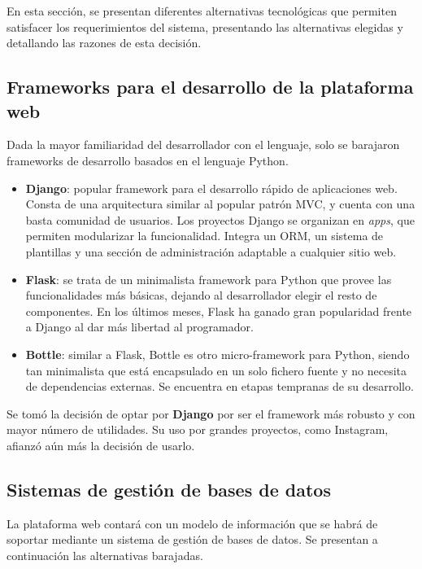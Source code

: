 En esta sección, se presentan diferentes alternativas tecnológicas que permiten
satisfacer los requerimientos del sistema, presentando las alternativas elegidas
y detallando las razones de esta decisión.


\subsection{Frameworks para el desarrollo de la plataforma web}

Dada la mayor familiaridad del desarrollador con el lenguaje, solo se barajaron
frameworks de desarrollo basados en el lenguaje Python.

\begin{itemize}
\item \textbf{Django}\cite{django}: popular framework para el desarrollo rápido
  de aplicaciones web. Consta de una arquitectura similar al popular patrón
  \ac{MVC}, y cuenta con una basta comunidad de usuarios. Los proyectos Django
  se organizan en \textit{apps}, que permiten modularizar la
  funcionalidad. Integra un \ac{ORM}, un sistema de plantillas y una sección de
  administración adaptable a cualquier sitio web.

\item \textbf{Flask}\cite{flask}: se trata de un minimalista framework para Python que
  provee las funcionalidades más básicas, dejando al desarrollador elegir el
  resto de componentes. En los últimos meses, Flask ha ganado gran popularidad
  frente a Django al dar más libertad al programador.

\item \textbf{Bottle}\cite{bottle}: similar a Flask, Bottle es otro
  micro-framework para Python, siendo tan minimalista que está encapsulado en un
  solo fichero fuente y no necesita de dependencias externas. Se encuentra en
  etapas tempranas de su desarrollo.

\end{itemize}

Se tomó la decisión de optar por \textbf{Django} por ser el framework más
robusto y con mayor número de utilidades. Su uso por grandes proyectos, como
Instagram, afianzó aún más la decisión de usarlo.

\subsection{Sistemas de gestión de bases de datos}

La plataforma web contará con un modelo de información que se habrá de soportar
mediante un sistema de gestión de bases de datos. Se presentan a continuación
las alternativas barajadas.

